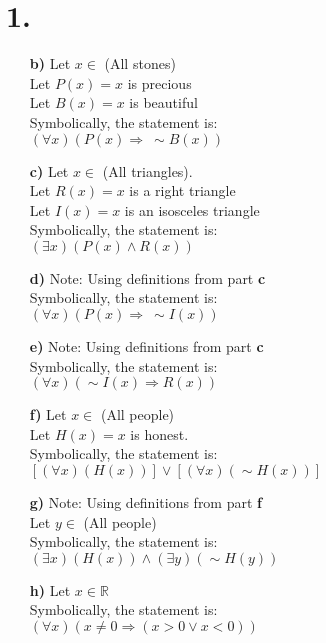 \documentclass[12pt,letterpaper]{article}
\begin{document}
\section*{1.}


\begin{enumerate}[label= \textbf{\alph*)}]
	\item[\textbf{b)}] Let $x \in $ (All stones)\\
						Let $P(x) = x$ is precious\\
						Let $B(x) = x$ is beautiful\\
						Symbolically, the statement is:\\
						$(\forall x)(P(x) \Rightarrow\ \sim B(x))$ 
	\item[\textbf{c)}] Let $x \in $ (All triangles).\\
						Let $R(x) = x$ is a right triangle\\
						Let $I(x) = x$ is an isosceles triangle\\
						Symbolically, the statement is:\\
						$(\exists x) (P(x) \land R(x))$ 
	\item[\textbf{d)}] Note: Using definitions from part \textbf{c}\\
						Symbolically, the statement is:\\
						$(\forall x) (P(x) \Rightarrow\ \sim I(x))$
	\item[\textbf{e)}] Note: Using definitions from part \textbf{c}\\
						Symbolically, the statement is:\\
						$(\forall x) (\sim I(x) \Rightarrow R(x))$ 
	\item[\textbf{f)}]  Let $x \in$ (All people)\\
						Let $H(x) = x$ is honest.\\
						Symbolically, the statement is:\\
						$[(\forall x)(H(x))] \lor [(\forall x)(\sim H(x))]$ 
	\item[\textbf{g)}] Note: Using definitions from part \textbf{f}\\
						Let $y \in$ (All people)\\ 
						Symbolically, the statement is:\\
						$(\exists x)(H(x)) \land (\exists y)(\sim H(y))$
	\item[\textbf{h)}] Let $x \in \mathbb{R}$\\
						Symbolically, the statement is:\\
						$(\forall x)(x \neq 0 \Rightarrow (x > 0 \lor x < 0))$ 

\end{enumerate}
\end{document}
